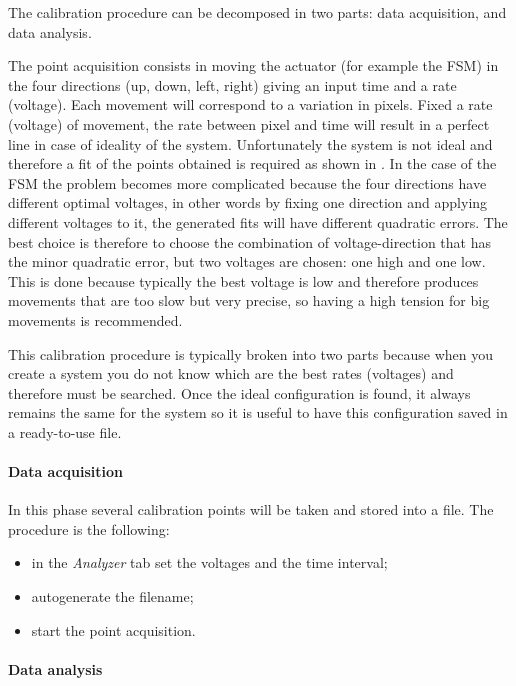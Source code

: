 The calibration procedure can be decomposed in two parts:
data acquisition, and data analysis.

The point acquisition consists in moving the actuator (for example the FSM) in the four directions (up, down, left, right) giving an input time and a rate (voltage). Each movement will correspond to a variation in pixels.
Fixed a rate (voltage) of movement, the rate between pixel and time will result in a perfect line in case of ideality of the system. Unfortunately the system is not ideal and therefore a fit of the points obtained is required as shown in .
In the case of the FSM the problem becomes more complicated because the four directions have different optimal voltages, in other words by fixing one direction and applying different voltages to it, the generated fits will have different quadratic errors.
The best choice is therefore to choose the combination of voltage-direction that has the minor quadratic error, but two voltages are chosen: one high and one low. This is done because typically the best voltage is low and therefore produces movements that are too slow but very precise, so having a high tension for big movements is recommended.

This calibration procedure is typically broken into two parts because when you create a system you do not know which are the best rates (voltages) and therefore must be searched.
Once the ideal configuration is found, it always remains the same for the system so it is useful to have this configuration saved in a ready-to-use file.

\paragraph{Data acquisition}

In this phase several calibration points will be taken and stored into a file. The procedure
is the following:

\begin{itemize}
      \itemsep1pt\parskip0pt
      \item
            in the \emph{Analyzer} tab set the voltages and the time interval;
      \item
            autogenerate the filename;
      \item
            start the point acquisition.
\end{itemize}

\paragraph{Data analysis}

